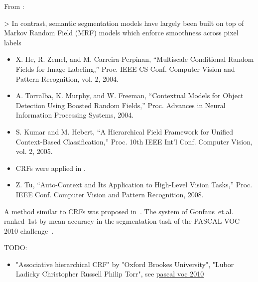 








From \cite{yang2012layered}:

> In contrast, semantic segmentation models have largely been built on top of
Markov Random Field (MRF) models which enforce smoothness across pixel labels

\begin{itemize}
    \item X. He, R. Zemel, and M. Carreira-Perpinan, “Multiscale Conditional
          Random Fields for Image Labeling,” Proc. IEEE CS Conf. Computer
          Vision and Pattern Recognition, vol. 2, 2004.
    \item A. Torralba, K. Murphy, and W. Freeman, “Contextual Models for
          Object Detection Using Boosted Random Fields,” Proc. Advances in
          Neural Information Processing Systems, 2004.
    \item S. Kumar and M. Hebert, “A Hierarchical Field Framework for
          Unified Context-Based Classification,” Proc. 10th IEEE Int’l Conf.
          Computer Vision, vol. 2, 2005.
    \item \Glspl{CRF} were applied in \cite{shotton2006textonboost}.
    \item Z. Tu, “Auto-Context and Its Application to High-Level Vision
          Tasks,” Proc. IEEE Conf. Computer Vision and Pattern Recognition,
          2008.
\end{itemize}


A method similar to \glspl{CRF} was proposed in~\cite{gonfaus2010harmony}.
The system of Gonfaus~et.al. ranked~1st by mean accuracy in the segmentation
task of the PASCAL VOC 2010 challenge~\cite{everingham2010pascal}.

TODO:

\begin{itemize}
    \item "Associative hierarchical CRF" by "Oxford Brookes University", "Lubor Ladicky Christopher Russell Philip Torr", see \href{http://host.robots.ox.ac.uk/pascal/VOC/voc2010/results/index.html}{pascal voc 2010}
\end{itemize}